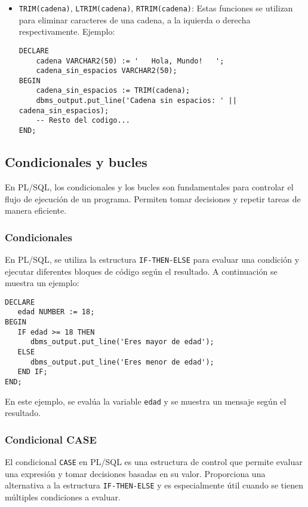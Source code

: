 \documentclass[executivepaper]{article}
\begin{document}
\begin{itemize}
    \item \texttt{TRIM(cadena)}, \texttt{LTRIM(cadena)}, \texttt{RTRIM(cadena)}: Estas funciones se utilizan para eliminar caracteres de una cadena, a la iquierda o derecha respectivamente. Ejemplo:
\begin{lstlisting}
DECLARE
    cadena VARCHAR2(50) := '   Hola, Mundo!   ';
    cadena_sin_espacios VARCHAR2(50);
BEGIN
    cadena_sin_espacios := TRIM(cadena);
    dbms_output.put_line('Cadena sin espacios: ' || cadena_sin_espacios);
    -- Resto del codigo...
END;
\end{lstlisting}
 \end{itemize}

\subsection{Condicionales y bucles}

En PL/SQL, los condicionales y los bucles son fundamentales para controlar el flujo de ejecución de un programa. Permiten tomar decisiones y repetir tareas de manera eficiente.

\subsubsection*{Condicionales}

En PL/SQL, se utiliza la estructura \texttt{IF-THEN-ELSE} para evaluar una condición y ejecutar diferentes bloques de código según el resultado. A continuación se muestra un ejemplo:

\begin{lstlisting}
DECLARE
   edad NUMBER := 18;
BEGIN
   IF edad >= 18 THEN
      dbms_output.put_line('Eres mayor de edad');
   ELSE
      dbms_output.put_line('Eres menor de edad');
   END IF;
END;
\end{lstlisting}

En este ejemplo, se evalúa la variable \texttt{edad} y se muestra un mensaje según el resultado.

\subsubsection*{Condicional CASE}

El condicional \texttt{CASE} en PL/SQL es una estructura de control que permite evaluar una expresión y tomar decisiones basadas en su valor. Proporciona una alternativa a la estructura \texttt{IF-THEN-ELSE} y es especialmente útil cuando se tienen múltiples condiciones a evaluar.
\end{document}
